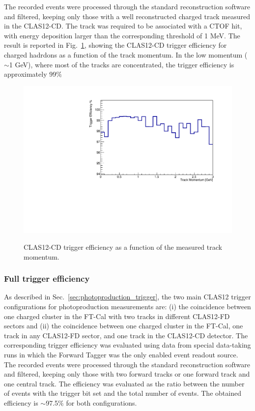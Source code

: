 The recorded events were processed through the standard reconstruction software and filtered, keeping only those with a well reconstructed charged track measured in the CLAS12-CD. The track was required to be associated with a CTOF hit, with energy deposition larger than the corresponding threshold of 1 MeV. The result is reported in Fig.~\ref{fig:CD_TrackEfficiency}, showing the CLAS12-CD trigger efficiency for charged hadrdons as a function of the track momentum. In the low momentum (${\sim}$1 GeV), where most of the tracks are concentrated, the trigger efficiency is approximately 99$\%$

\begin{figure}[!htb]
 \centering
{\includegraphics[width=.5\textwidth]{img/CD_TrackEfficiency.pdf}}
 \caption{CLAS12-CD trigger efficiency as a function of the measured track momentum.}
 \label{fig:CD_TrackEfficiency}
\end{figure}

\subsubsection{Full trigger efficiency}
As described in Sec.~\ref{sec:photoproduction_trigger}, the two main CLAS12 trigger configurations for photoproduction measurements are: (i) the coincidence between one charged cluster in the FT-Cal with two tracks in different CLAS12-FD sectors and (ii) the coincidence between one charged cluster in the FT-Cal, one track in any CLAS12-FD sector, and one track in the CLAS12-CD detector. The corresponding trigger efficiency was evaluated using data from special data-taking runs in which the Forward Tagger was the only enabled event readout source. The recorded events were processed through the standard reconstruction software and filtered, keeping only those with two forward tracks or one forward track and one central track. The efficiency was evaluated as the ratio between the number of events with the trigger bit set and the total number of events. The obtained efficiency is $\sim$97.5$\%$ for both configurations. 
